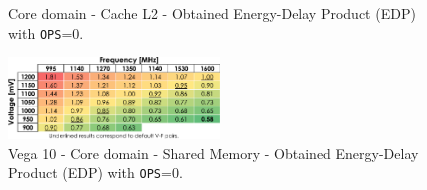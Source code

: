 \begin{figure}[!htb]
    \centering
    \begin{subfigmatrix}{2}
      \label{fig:cache_edp}
    \end{subfigmatrix}
    \caption{Core domain - Cache L2 - Obtained Energy-Delay Product (EDP) with \texttt{OPS}=0.}
\end{figure}


\begin{figure}[htb]
  \centering
  \includegraphics[width=0.5\textwidth]{Figures/GPU_characterization/SM_EDP_OPS0.pdf}
  \caption{Vega 10 - Core domain - Shared Memory - Obtained Energy-Delay Product (EDP) with \texttt{OPS}=0.}
  \label{fig:sm_edp}
\end{figure}




